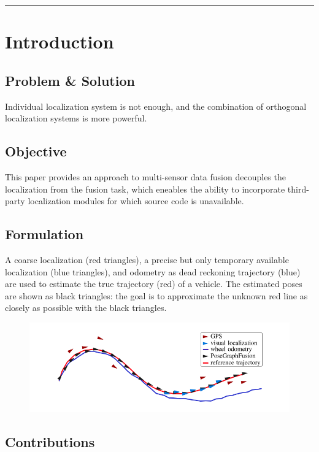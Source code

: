 \documentclass[letterpaper,11pt]{article}
\begin{document}
\begin{center}\rule{\textwidth}{1pt}\end{center}
\section{Introduction}

\subsection{Problem \& Solution}

Individual localization system is not enough, and the combination of orthogonal localization systems is more powerful.

\subsection{Objective}

This paper provides an approach to multi-sensor data fusion decouples the localization from the fusion task, which eneables the ability to incorporate third-party localization modules for which source code is unavailable.

\subsection{Formulation}

A coarse localization (red triangles), a precise but only temporary available localization (blue triangles), and odometry as dead reckoning trajectory (blue) are used to estimate the true trajectory (red) of a vehicle. The estimated poses are shown as black triangles: the goal is to approximate the unknown red line as closely as possible with the black triangles.

\begin{figure}[!ht]
	\centering
	\includegraphics[width=15cm]{./img/posefusion.png}
\end{figure}

\subsection{Contributions}
\end{document}
